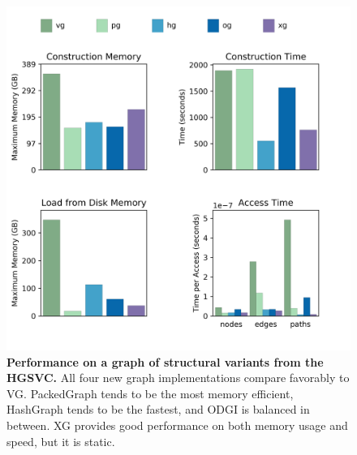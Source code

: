 \documentclass{article}
\begin{document}
\begin{figure}
	\begin{center}
		\includegraphics[width=.75\textwidth]{figures/HGSVC_sorted_gfa.png}
	\end{center}
	\caption{{\label{fig:hgsvc} \textbf{Performance on a graph of structural variants from the HGSVC.} All four new graph implementations compare favorably to VG. PackedGraph tends to be the most memory efficient, HashGraph tends to be the fastest, and ODGI is balanced in between. XG provides good performance on both memory usage and speed, but it is static.}}
\end{figure}





\end{document}

